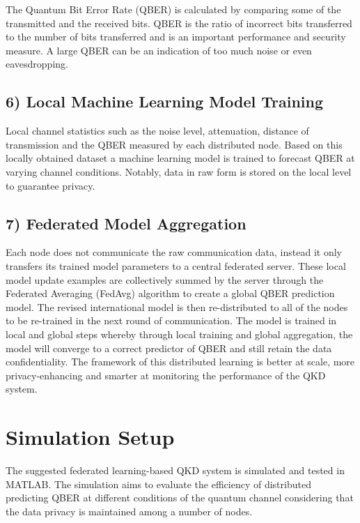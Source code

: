 \documentclass[conference]{IEEEtran}
\begin{document}
The Quantum Bit Error Rate (QBER) is calculated by comparing some of the transmitted and the received bits. QBER is the ratio of incorrect bits transferred to the number of bits transferred and is an important performance and security measure. A large QBER can be an indication of too much noise or even eavesdropping.

\subsection*{6) Local Machine Learning Model Training}

Local channel statistics such as the noise level, attenuation, distance of transmission and the QBER measured by each distributed node. Based on this locally obtained dataset a machine learning model is trained to forecast QBER at varying channel conditions. Notably, data in raw form is stored on the local level to guarantee privacy. 

\subsection*{7) Federated Model Aggregation}

Each node does not communicate the raw communication data, instead it only transfers its trained model parameters to a central federated server. These local model update examples are collectively summed by the server through the Federated Averaging (FedAvg) algorithm to create a global QBER prediction model. The revised international model is then re-distributed to all of the nodes to be re-trained in the next round of communication. The model is trained in local and global steps whereby through local training and global aggregation, the model will converge to a correct predictor of QBER and still retain the data confidentiality. The framework of this distributed learning is better at scale, more privacy-enhancing and smarter at monitoring the performance of the QKD system. 

\section{Simulation Setup}

The suggested federated learning-based QKD system is simulated and tested in MATLAB. The simulation aims to evaluate the efficiency of distributed predicting QBER at different conditions of the quantum channel considering that the data privacy is maintained among a number of nodes. 
\end{document}
